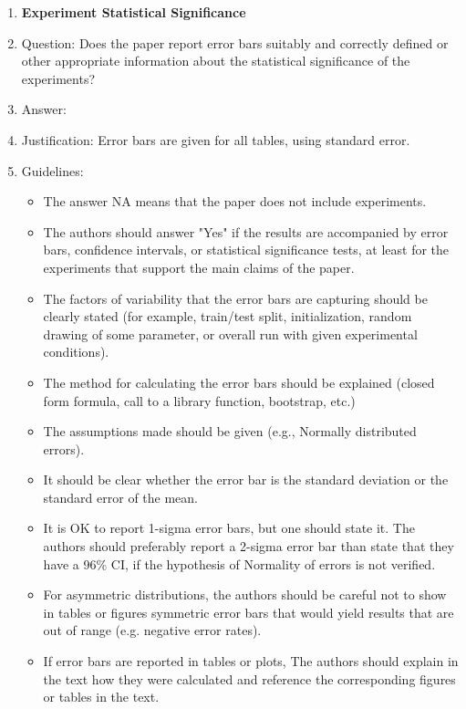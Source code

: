 \documentclass{article}
\theoremstyle{plain}
\theoremstyle{definition}
\theoremstyle{remark}
\begin{document}
\begin{enumerate}
\item {\bf Experiment Statistical Significance}
    \item[] Question: Does the paper report error bars suitably and correctly defined or other appropriate information about the statistical significance of the experiments?
    \item[] Answer: \answerYes{} %
    \item[] Justification: Error bars are given for all tables, using standard error.
    \item[] Guidelines:
    \begin{itemize}
        \item The answer NA means that the paper does not include experiments.
        \item The authors should answer "Yes" if the results are accompanied by error bars, confidence intervals, or statistical significance tests, at least for the experiments that support the main claims of the paper.
        \item The factors of variability that the error bars are capturing should be clearly stated (for example, train/test split, initialization, random drawing of some parameter, or overall run with given experimental conditions).
        \item The method for calculating the error bars should be explained (closed form formula, call to a library function, bootstrap, etc.)
        \item The assumptions made should be given (e.g., Normally distributed errors).
        \item It should be clear whether the error bar is the standard deviation or the standard error of the mean.
        \item It is OK to report 1-sigma error bars, but one should state it. The authors should preferably report a 2-sigma error bar than state that they have a 96\% CI, if the hypothesis of Normality of errors is not verified.
        \item For asymmetric distributions, the authors should be careful not to show in tables or figures symmetric error bars that would yield results that are out of range (e.g. negative error rates).
        \item If error bars are reported in tables or plots, The authors should explain in the text how they were calculated and reference the corresponding figures or tables in the text.
    \end{itemize}


\end{enumerate}
\end{document}
